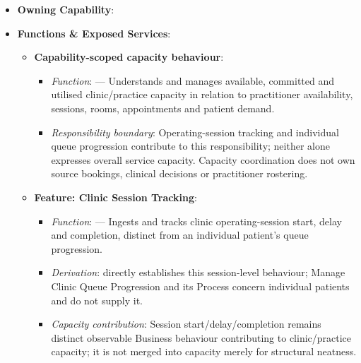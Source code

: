 \begin{itemize}

\item 
\textbf{Owning Capability}: \texttt{}



\item 
\textbf{Functions \& Exposed Services}:


\begin{itemize}

\item 
\textbf{Capability-scoped capacity behaviour}:


\begin{itemize}

\item 
\emph{Function}: \texttt{} — Understands and manages available, committed and utilised clinic/\allowbreak{}practice capacity in relation to practitioner availability, sessions, rooms, appointments and patient demand.



\item 
\emph{Responsibility boundary}: Operating-session tracking and individual queue progression contribute to this responsibility; neither alone expresses overall service capacity. Capacity coordination does not own source bookings, clinical decisions or practitioner rostering.



\end{itemize}


\item 
\textbf{Feature: Clinic Session Tracking}:


\begin{itemize}

\item 
\emph{Function}: \texttt{} — Ingests and tracks clinic operating-session start, delay and completion, distinct from an individual patient's queue progression.



\item 
\emph{Derivation}: \texttt{} directly establishes this session-level behaviour; Manage Clinic Queue Progression and its Process concern individual patients and do not supply it.



\item 
\emph{Capacity contribution}: Session start/\allowbreak{}delay/\allowbreak{}completion remains distinct observable Business behaviour contributing to clinic/\allowbreak{}practice capacity; it is not merged into capacity merely for structural neatness.




\end{itemize}
\end{itemize}
\end{itemize}
